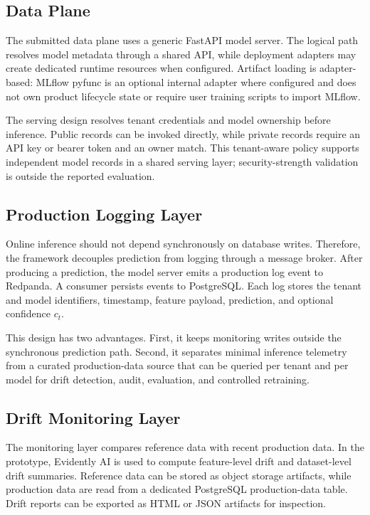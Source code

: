 \documentclass[runningheads]{llncs}
\begin{document}
\subsection{Data Plane}

The submitted data plane uses a generic FastAPI model server. The logical path resolves model metadata through a shared API, while deployment adapters may create dedicated runtime resources when configured. Artifact loading is adapter-based: MLflow pyfunc is an optional internal adapter where configured and does not own product lifecycle state or require user training scripts to import MLflow.

The serving design resolves tenant credentials and model ownership before inference. Public records can be invoked directly, while private records require an API key or bearer token and an owner match. This tenant-aware policy supports independent model records in a shared serving layer; security-strength validation is outside the reported evaluation.

\subsection{Production Logging Layer}

Online inference should not depend synchronously on database writes. Therefore, the framework decouples prediction from logging through a message broker. After producing a prediction, the model server emits a production log event to Redpanda. A consumer persists events to PostgreSQL. Each log stores the tenant and model identifiers, timestamp, feature payload, prediction, and optional confidence $c_t$.

This design has two advantages. First, it keeps monitoring writes outside the synchronous prediction path. Second, it separates minimal inference telemetry from a curated production-data source that can be queried per tenant and per model for drift detection, audit, evaluation, and controlled retraining.

\subsection{Drift Monitoring Layer}

The monitoring layer compares reference data with recent production data. In the prototype, Evidently AI is used to compute feature-level drift and dataset-level drift summaries. Reference data can be stored as object storage artifacts, while production data are read from a dedicated PostgreSQL production-data table. Drift reports can be exported as HTML or JSON artifacts for inspection.
\end{document}
